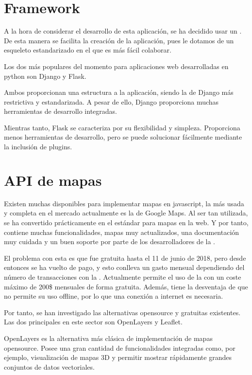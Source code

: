   \section{Framework}
    A la hora de considerar el desarrollo de esta aplicación, se ha decidido usar un . De esta manera se facilita la creación de la aplicación, pues le dotamos de un esqueleto estandarizado en el que es más fácil colaborar.
    
    Los dos  más populares del momento para aplicaciones web desarrolladas en python son Django\cite{django} y Flask\cite{flask}.
    
    Ambos proporcionan una estructura a la aplicación, siendo la de Django más restrictiva y estandarizada. A pesar de ello, Django proporciona muchas herramientas de desarrollo integradas.
    
    Mientras tanto, Flask se caracteriza por su flexibilidad y simpleza. Proporciona menos herramientas de desarrollo, pero se puede solucionar fácilmente mediante la inclusión de plugins.
    
  
  \section{API de mapas}
  
    Existen muchas  disponibles para implementar mapas en javascript, la más usada y completa en el mercado actualmente es la de Google Maps\cite{gmaps}. Al ser tan utilizada, se ha convertido prácticamente en el estándar para mapas en la web. Y por tanto, contiene muchas funcionalidades, mapas muy actualizados, una documentación muy cuidada y un buen soporte por parte de los desarrolladores de la .
    
    El problema con esta  es que fue gratuita hasta el 11 de junio de 2018, pero desde entonces se ha vuelto de pago, y esto conlleva un gasto mensual dependiendo del número de transacciones con la . Actualmente permite el uso de la  con un coste máximo de 200\$ mensuales de forma gratuita. Además, tiene la desventaja de que no permite su uso offline, por lo que una conexión a internet es necesaria.

    
    Por tanto, se han investigado las alternativas opensource y gratuitas existentes. Las dos  principales en este sector son OpenLayers\cite{openlayers} y Leaflet\cite{leaflet}.
    
    OpenLayers es la alternativa más clásica de implementación de mapas opensource. Posee una gran cantidad de funcionalidades integradas como, por ejemplo, visualización de mapas 3D y permitir mostrar rápidamente grandes conjuntos de datos vectoriales.
    
